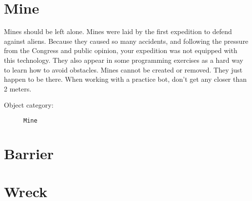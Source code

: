\section{Mine}

Mines should be left alone.
Mines were laid by the first expedition to defend against aliens. Because they caused so
many accidents, and following the pressure from the Congress and public opinion, your
expedition was not equipped with this technology.
They also appear in some programming exercises as a hard way to learn how to avoid obstacles. Mines
cannot be created or removed. They just happen to be there.
When working with a practice bot, don't get any closer than 2 meters.

\begin{description}
    \item[Object category:] \texttt{Mine}
\end{description}


\section{Barrier}


\section{Wreck}

